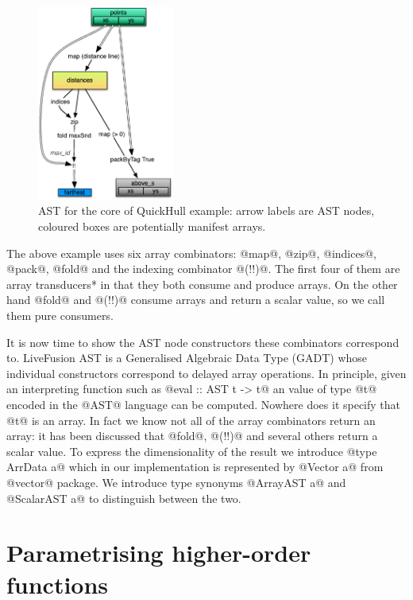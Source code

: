 \documentclass[preamble.tex]{subfiles}
\begin{document}
\begin{figure}
\includegraphics[width=0.4\textwidth,center]{img/QuickHull-flat-but-true}
\caption{\label{fig:QHFlat}{AST for the core of QuickHull example: arrow labels are AST nodes, coloured boxes are potentially manifest arrays.}}
\end{figure}

The above example uses six array combinators: @map@, @zip@, @indices@, @pack@, @fold@ and the indexing combinator @(!!)@. The first four of them are \*array transducers* in that they both consume and produce arrays. On the other hand @fold@ and @(!!)@ consume arrays and return a scalar value, so we call them pure consumers.

It is now time to show the AST node constructors these combinators correspond to. LiveFusion AST is a Generalised Algebraic Data Type (GADT)  whose individual constructors correspond to delayed array operations. In principle, given an interpreting function such as @eval :: AST t -> t@ an value of type @t@ encoded in the @AST@ language can be computed. Nowhere does it specify that @t@ is an array. In fact we know not all of the array combinators return an array: it has been discussed that @fold@, @(!!)@ and several others return a scalar value. To express the dimensionality of the result we introduce @type ArrData a@ which in our implementation is represented by @Vector a@ from @vector@ package. We introduce type synonyms @ArrayAST a@ and @ScalarAST a@ to distinguish between the two.





\section{Parametrising higher-order functions}
\end{document}
